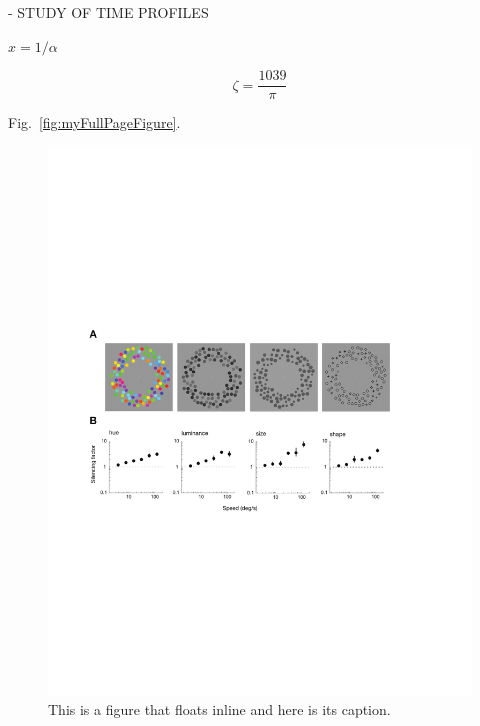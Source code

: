- STUDY OF TIME PROFILES



$x = 1/\alpha$ 

\cite{Eigen1971, Knuth1968}

$$\zeta = \frac{1039}{\pi}$$

Fig.~\ref{fig:myFullPageFigure}.

\begin{figure}  
\includegraphics[width=\textwidth]{figures/fig1}
\caption[Short figure name.]{This is a figure that floats inline and here is its caption.
\label{fig:myInlineFigure}}
\end{figure}

\afterpage{\clearpage}


